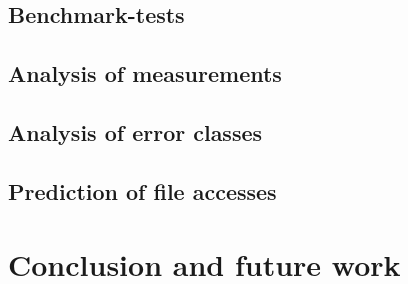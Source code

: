 \documentclass{superfri}
\begin{document}
\subsection{Benchmark-tests}

\subsection{Analysis of measurements}
\label{sec:measurements}

\subsection{Analysis of error classes}

\subsection{Prediction of file accesses}

\section{Conclusion and future work}


\openaccess



\end{document}
